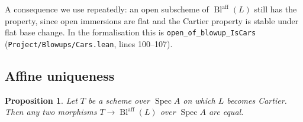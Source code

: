 \documentclass[pdflatex,sn-mathphys-num]{sn-jnl}
\theoremstyle{plain}
\newtheorem{proposition}[theorem]{Proposition}
\theoremstyle{definition}
\newcommand{\Spec}{\operatorname{Spec}}
\newcommand{\BlM}{\operatorname{Bl}^{\mathrm{aff}}}
\begin{document}
A consequence we use repeatedly: an open subscheme of $\BlM(L)$ still has the
property, since open immersions are flat and the Cartier property is stable under flat
base change. In the formalisation this is
\texttt{open\_of\_blowup\_IsCars} (\texttt{Project/Blowups/Cars.lean}, lines
100--107).

\subsection{Affine uniqueness}\label{ssec:aff-uniq}

\begin{proposition}\label{prop:aff-uniq}
Let $T$ be a scheme over $\Spec A$ on which $L$ becomes Cartier. Then any two
morphisms $T \to \BlM(L)$ over $\Spec A$ are equal.
\end{proposition}
\end{document}
